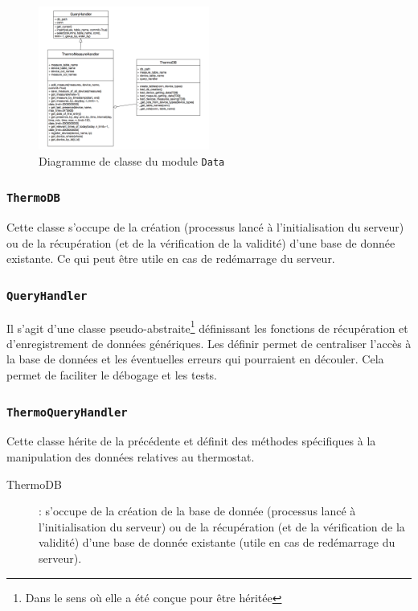 \documentclass[11pt,a4paper,11pt]{report}
\begin{document}
\begin{figure}
\centering
\includegraphics[width=0.5\textwidth]{images/Data_class_diagram.png} %
\caption{Diagramme de classe du module \texttt{Data}}
\label{Data_class_diagram}
\end{figure}

\subsubsection{\texttt{ThermoDB}}

Cette classe s'occupe de la création (processus lancé à l'initialisation du serveur) ou de la récupération (et de la vérification de la validité) d'une base de donnée existante. Ce qui peut être utile en cas de redémarrage du serveur.


\subsubsection{\texttt{QueryHandler}}

Il s'agit d'une classe pseudo-abstraite\footnote{Dans le sens où elle a été conçue pour être héritée} définissant les fonctions de récupération et d'enregistrement de données génériques. Les définir permet de centraliser l'accès à la base de données et les éventuelles erreurs qui pourraient en découler. Cela permet de faciliter le débogage et les tests. %

\subsubsection{\texttt{ThermoQueryHandler}}
Cette classe hérite de la précédente et définit des méthodes spécifiques à la manipulation des données relatives au thermostat. 


\iffalse
\begin{description}
\item[ThermoDB]: s'occupe de la création de la base de donnée (processus lancé à l'initialisation du serveur) ou de la récupération (et de la vérification de la validité) d'une base de donnée existante (utile en cas de redémarrage du serveur). 
\end{description}
\end{document}
